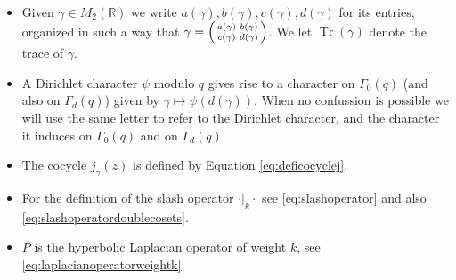\documentclass{article}
\theoremstyle{named}
\newcommand{\Z}{\mathbb{Z}}
\newcommand{\R}{\mathbb{R}}
\DeclareMathOperator{\SL}{SL}
\DeclareMathOperator{\Tr}{Tr}
\DeclareMathOperator{\modulo}{mod}
\begin{document}
\begin{itemize}
    \begin{equation*}
    \begin{aligned}
        \Gamma_0(q) & := \{\begin{psmallmatrix}
            a & b\\
            c & d
        \end{psmallmatrix} \in \SL_2(\Z) : c = 0 \modulo q\},\quad \Gamma_1(q) := \{\begin{psmallmatrix}
            a & b\\
            c & d
        \end{psmallmatrix} \in \Gamma_0(q) : a = d = 1 \modulo q\},\\
        \Gamma_d(q) & := \{\begin{psmallmatrix}
            a & b\\
            c & d
        \end{psmallmatrix} \in \Gamma_0(q): b = 0 \modulo q\}, \quad \, \, \, \, \Gamma(q) := \{\begin{psmallmatrix}
            a & b\\
            c & d
        \end{psmallmatrix} \in \Gamma_1(q): b = 0 \modulo q\}.  
    \end{aligned}
    \end{equation*}
    \item Given $\gamma \in M_2(\R)$ we write $a(\gamma), b(\gamma), c(\gamma), d(\gamma)$ for its entries, organized in such a way that $\gamma = \begin{psmallmatrix}
    a(\gamma) & b(\gamma)\\
    c(\gamma) & d(\gamma)
\end{psmallmatrix}$. We let $\Tr(\gamma)$ denote the trace of $\gamma$.
    \item A Dirichlet character $\psi$ modulo $q$ gives rise to a character on $\Gamma_0(q)$ (and also on $\Gamma_d(q)$) given by $\gamma \mapsto \psi(d(\gamma))$. When no confussion is possible we will use the same letter to refer to the Dirichlet character, and the character it induces on $\Gamma_0(q)$ and on $\Gamma_d(q)$.
    \item The cocycle $j_\gamma(z)$ is defined by Equation \eqref{eq:deficocyclej}.
    \item For the definition of the slash operator $\cdot |_k \cdot$ see \eqref{eq:slashoperator} and also \eqref{eq:slashoperatordoublecosets}. 
    \item $P$ is the hyperbolic Laplacian operator of weight $k$, see \eqref{eq:laplacianoperatorweightk}. 

\end{itemize}
\end{document}
